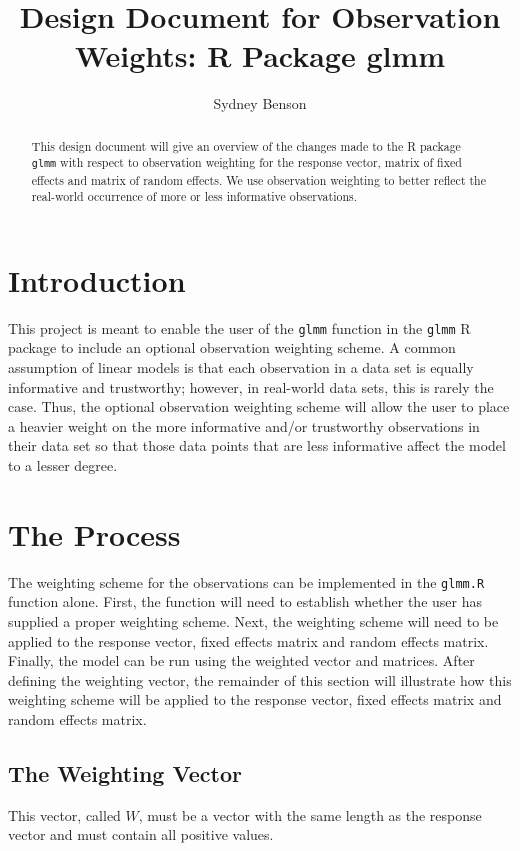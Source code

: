 \documentclass{article}
\title{Design Document for Observation Weights: R Package glmm}
\author{Sydney Benson}
\begin{document}
\maketitle{}

\begin{abstract}
This design document will give an overview of the changes made to the R package \texttt{glmm} with respect to observation weighting for the response vector, matrix of fixed effects and matrix of random effects. We use observation weighting to better reflect the real-world occurrence of more or less informative observations.
\end{abstract}

\section{Introduction}
This project is meant to enable the user of the \texttt{glmm} function in the \texttt{glmm} R package to include an optional observation weighting scheme. A common assumption of linear models is that each observation in a data set is equally informative and trustworthy; however, in real-world data sets, this is rarely the case. Thus, the optional observation weighting scheme will allow the user to place a heavier weight on the more informative and/or trustworthy observations in their data set so that those data points that are less informative affect the model to a lesser degree.

\section{The Process}
The weighting scheme for the observations can be implemented in the \texttt{glmm.R} function alone. First, the function will need to establish whether the user has supplied a proper weighting scheme. Next, the weighting scheme will need to be applied to the response vector, fixed effects matrix and random effects matrix. Finally, the model can be run using the weighted vector and matrices. After defining the weighting vector, the remainder of this section will illustrate how this weighting scheme will be applied to the response vector, fixed effects matrix and random effects matrix. 

\subsection{The Weighting Vector}
This vector, called $W$, must be a vector with the same length as the response vector and must contain all positive values. 
\end{document}
